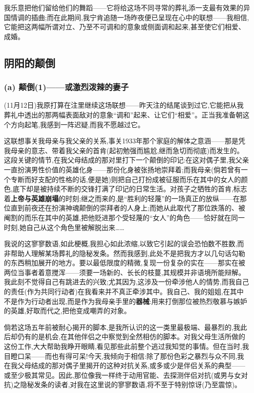 我乐意把他们留给他们的舞蹈——它将给这场不同寻常的葬礼添一支最有效果的异国情调的插曲;而在此期间,我宁肯追随一场昨夜便已呈现在心中的联想——我相信,它能把这两幅所谓对立、乃至不可调和的意象或侧面调和起来,甚至使它们相爱、成婚。

\subsection{阴阳的颠倒}
\label{ch18:local:h34}

\subsubsection*{(a) 颠倒(1)——或激烈泼辣的妻子}
\label{ch18:local:h35}

\label{ch18:local:n30}

(11月12日)我原打算在注里继续这场联想——昨天注的结尾谈到过它,它能把从我葬礼中透出的那两幅表面敌对的意象“调和”起来、让它们“相爱”。正当我准备朝这个方向起笔,我感到一阵迟疑,而我不愿越过它。

这联想事关我母亲与我父亲的关系,事关1933年那个家庭的解体之意涵——那是凭我母亲的意志、带着我父亲的首肯(起初勉强而尴尬,继而急切而彻底)而发生的。这段关键的情节,在我父母结成的那对\dmark{}里打下一个颠倒的印记:在这对偶子里,我父亲一直扮演男性价值的英雄化身——那份化身被张扬地崇拜着;而我母亲(倘若曾有一个专断而好支配的性格的话,便是她)则把自己打扮成被征服而乐在其中的女人的颜色,底下却是被持续不断的交锋打满了印记的日常生活。对孩子之牺牲的首肯,标志着\textbf{上帝与英雄崩塌}的时刻;继之而来的,是“胜利的轻蔑”的一场真正的放纵——在那位直到前夜还在扮演神魂颠倒的崇拜者的人身上;而她从此取代了那位跌落的、被阉割的而乐在其中的英雄,把他贬进那个受轻蔑的“女人”的角色——恰好就在同一时刻,她自己从这个角色里被解脱出来……

我说的这寥寥数语,如此梗概,我担心如此浓缩,以致它引起的误会恐怕数不胜数,而非帮助人理解某场葬礼的隐秘发条。然而我感到,此处不是把我方才以几句话勾勒的东西稍加展开的地方。要以最低限度的精微,复现一份复杂的实在——那实在被两位当事者着意搅浑——须要一场新的、长长的枝蔓,其规模并非语境所能辩解。我此刻不觉得自己有跳进去的兴致;尤其因为,这涉及一份牵涉他人的情势,而我自己的责任(作为共同行动者)在我看来并不真正牵涉其中。我自己、我的姐姐,在其中不是作为行动者出现,而是作为我母亲手里的\textbf{器械}:用来打倒那位被热烈敬慕与嫉妒的英雄,好取而代之,把他变成嘲弄的对象。

倘若这场五年前被耐心揭开的脚本,是我所认识的这一类里最极端、最暴烈的,我此后却仍有的是机会,在其他伴侣之中察觉到全然相仿的脚本。对我父母生活所做的这份工作,大大帮助我睁开眼睛,看见那些此前整个逃过我知觉的事情。但在当时,我目瞪口呆——而也有得可呆!今天,我倾向于相信:除了那份色彩之暴烈与众不同,我在我父母结成的那对偶子里揭开的这种对抗关系,或多或少是伴侣关系的典型——或至少极其常见。因此,那位像我一样终于动用官能、去探测伴侣对抗(或男与女对抗)之隐秘发条的读者,对我在这里说的寥寥数语,将不至于特别惊讶(乃至震惊)。

